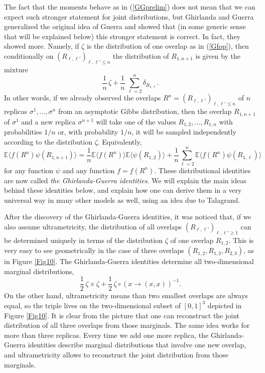 \documentclass[12pt]{article}
\newcommand{\e}{\mathbb{E}}
\newcommand{\la}{\langle}
\newcommand{\ra}{\rangle}
\theoremstyle{nonumberplain}
\begin{document}
The fact that the moments behave as in (\ref{GGprelim}) does not mean that we can expect such stronger statement for joint distributions, but Ghirlanda and Guerra \cite{GG} generalized the original idea of Guerra and showed that (in some generic sense that will be explained below) this stronger statement is correct. In fact, they showed more. Namely, if $\zeta$ is the distribution of one overlap as in (\ref{Gfop}), then conditionally on $(R_{\ell,\ell'})_{\ell,\ell' \leq n}$ the distribution of $R_{1,n+1}$ is given by the mixture 
$$
\frac{1}{n}\, \zeta + \frac{1}{n}\, \sum_{\ell=2}^n \delta_{R_{1,\ell}}.
$$ 
In other words, if we already observed the overlaps $R^n=(R_{\ell,\ell'})_{\ell,\ell' \leq n}$ of $n$ replicas $\sigma^1,\ldots,\sigma^n$ from an asymptotic Gibbs distribution, then the overlap $R_{1,n+1}$ of $\sigma^1$ and a new replica $\sigma^{n+1}$ will take one of the values $R_{1,2},\ldots, R_{1,n}$ with probabilities $1/n$ or, with probability $1/n$, it will be sampled independently according to the distribution $\zeta$. Equivalently,
$$
\e \bigl\la f(R^n) \psi(R_{1,n+1})\bigr\ra = \frac{1}{n} \e \bigl\la f(R^n)\bigr\ra  \e \bigl\la \psi(R_{1,2})\bigr\ra + \frac{1}{n}\sum_{\ell=2}^n \e \bigl\la f(R^n)\psi(R_{1,\ell})\bigr\ra
$$
for any function $\psi$ and any function $f=f(R^n)$. These distributional identities are now called \emph{the Ghirlanda-Guerra identities}. We will explain the main ideas behind these identities below, and explain how one can derive them in a very universal way in many other models as well, using an idea due to Talagrand.

After the discovery of the Ghirlanda-Guerra identities, it was noticed that, if we also assume ultrametricity, the distribution of all overlaps $(R_{\ell,\ell'})_{\ell,\ell' \geq 1}$ can be determined uniquely in terms of the distribution $\zeta$ of one overlap $R_{1,2}$. This is very easy to see geometrically in the case of three overlaps $(R_{1,2}, R_{1,3}, R_{2,3})$, as in Figure \ref{Fig10}. The Ghirlanda-Guerra identities determine all two-dimensional marginal distributions,
$$
\frac{1}{2}\,\zeta \times \zeta + \frac{1}{2}\, \zeta\circ(x\to(x,x))^{-1}.
$$
On the other hand, ultrametricity means than two smallest overlaps are always equal, so the triple lives on the two-dimensional subset of $[0,1]^3$ depicted in Figure \ref{Fig10}. It is clear from the picture  that one can reconstruct the joint distribution of all three overlaps from those marginals. The same idea works for more than three replicas. Every time we add one more replica, the Ghirlanda-Guerra identities describe marginal distributions that involve one new overlap, and ultrametricity allows to reconstruct the joint distribution from those marginals. 
\end{document}
